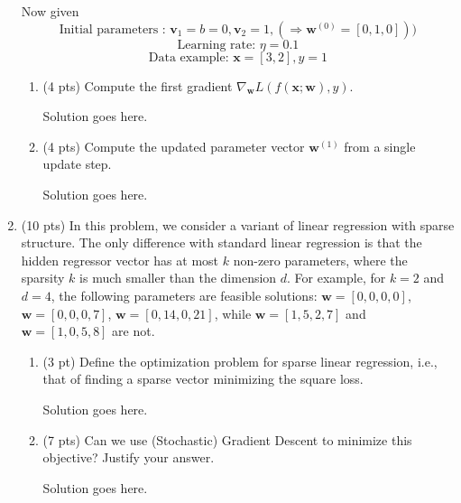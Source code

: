 \documentclass[a4paper]{article}
\theoremstyle{definition}
\renewcommand\vec[1]{\mathbf{#1}}
\newenvironment{soln}{
    \leavevmode\color{blue}\ignorespaces
}{}
\begin{document}
\begin{enumerate}
Now given
$$ \text{Initial parameters : } \vec v_{1}=b=0,\vec v_{2}=1,(\Rightarrow \vec w^{(0)}=[0, 1, 0]))$$
$$ \text{Learning rate: }\eta=0.1$$
$$ \text{Data example: } \vec x=[3, 2], y=1$$

\begin{enumerate}
	\item (4 pts) Compute the first gradient $\nabla_{\vec w} L(f(\vec x;\vec w), y)$.
	
	\begin{soln}  Solution goes here. \end{soln}
	
	\item (4 pts) Compute the updated parameter vector $\vec w^{(1)}$ from a single update step.
	
	\begin{soln}  Solution goes here. \end{soln}
\end{enumerate}

\item (10 pts) In this problem, we consider a variant of linear regression with sparse structure. The only difference with standard linear regression is that the hidden regressor vector has at most $k$ non-zero parameters, where the sparsity $k$ is much smaller than the dimension $d$. For example, for $k=2$ and $d=4$, the following parameters are feasible solutions: $\vec w=[0,0,0,0]$, $\vec w=[0,0,0,7]$,
$\vec w=[0,14,0,21]$, while $\vec w=[1,5,2,7]$ and $\vec w=[1,0,5,8]$ are not.
\begin{enumerate}
	\item (3 pt) Define the optimization problem for sparse linear regression, i.e., that of finding a sparse vector minimizing the square loss.
	
	\begin{soln}  Solution goes here. \end{soln}
	
	\item (7 pts) Can we use (Stochastic) Gradient Descent to minimize this objective? Justify your answer.
	
	\begin{soln}  Solution goes here. \end{soln}
\end{enumerate}
\end{enumerate}
\end{document}
